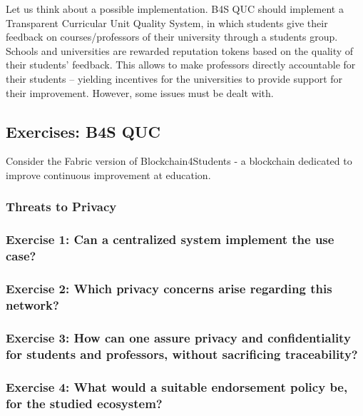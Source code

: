 \documentclass[12pt,a4paper]{article}
\theoremstyle{definition}
\begin{document}
Let us think about a possible implementation. B4S QUC should implement a Transparent Curricular Unit Quality System, in which students give their feedback on courses/professors of their university through a students group. Schools and universities are rewarded reputation tokens based on the quality of their students' feedback. This allows to make professors directly accountable for their students -- yielding incentives for the universities to provide support for their improvement.  However, some issues must be dealt with. 



\subsection{Exercises: B4S QUC} 

Consider the Fabric version of Blockchain4Students - a blockchain dedicated to improve continuous improvement at education.

\subsubsection{Threats to Privacy}

\subsubsection*{Exercise 1: Can a centralized system implement the use case?}

\subsubsection*{Exercise 2: Which privacy concerns arise regarding this network?}

\subsubsection*{Exercise 3: How can one assure privacy and confidentiality for students and professors, without sacrificing traceability?}


\subsubsection*{Exercise 4: What would a suitable endorsement policy be, for the studied ecosystem?}


\end{document}
